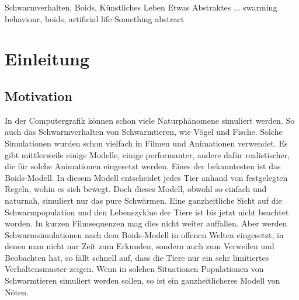 \documentclass[draft=false
              ,paper=a4
              ,twoside=false
              ,fontsize=11pt
              ,headsepline
              ,BCOR10mm
              ,DIV11
              ,bibtotoc
              ,liststotoc
              ]{scrbook}
\begin{document}


\frontmatter

\maketitle

\onehalfspacing

\HAWAbstractPage
{Schwarmverhalten, Boids, Künstliches Leben}%
{Etwas Abstraktes ...}
{swarming behaviour, boids, artificial life}%
{Something abstract}

\newpage
\singlespacing

\tableofcontents
\newpage
\listoftables
\listoffigures

\mainmatter
\onehalfspacing

\chapter{Einleitung}\label{einleitung}
\section{Motivation}
In der Computergrafik können schon viele Naturphänomene simuliert werden. So auch das Schwarmverhalten von Schwarmtieren, wie Vögel und Fische.
Solche Simulationen wurden schon vielfach in Filmen und Animationen verwendet. Es gibt mittlerweile einige Modelle, einige performanter, andere dafür realistischer, die für solche Animationen eingesetzt werden. Eines der bekanntesten ist das Boids-Modell. In diesem Modell entscheidet jedes Tier anhand von festgelegten Regeln, wohin es sich bewegt. Doch dieses Modell, obwohl so einfach und naturnah, simuliert nur das pure Schwärmen. Eine ganzheitliche Sicht auf die Schwarmpopulation und den Lebenszyklus der Tiere ist bis jetzt nicht beachtet worden. In kurzen Filmsequenzen mag dies nicht weiter auffallen. Aber werden Schwarmsimulationen nach dem Boids-Modell in offenen Welten eingesetzt, in denen man nicht nur Zeit zum Erkunden, sondern auch zum Verweilen und Beobachten hat, so fällt schnell auf, dass die Tiere nur ein sehr limitiertes Verhaltensmuster zeigen.
Wenn in solchen Situationen Populationen von Schwarmtieren simuliert werden sollen, so ist ein ganzheitlicheres Modell von Nöten.
\end{document}
